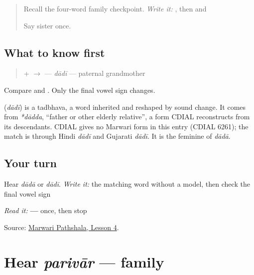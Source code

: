 \label{lesson:MW-C08-dadi}



\begin{quote}
Recall the four-word family checkpoint. \emph{Write it:} \textbf{}, then \textbf{} and \textbf{}

Say sister once.
\end{quote}

\subsection*{What to know first}
\begin{quote}
\textbf{} + \textbf{} $\to$ \textbf{} — \emph{dādī} — paternal grandmother
\end{quote}

Compare \textbf{} and \textbf{}. Only the final vowel sign changes.

\begin{cousinweb}
\textbf{} (\emph{dādī}) is a tadbhava, a word inherited and reshaped by sound change. It comes from \emph{*dādda}, \textquotedblleft{}father or other elderly relative\textquotedblright{}, a form CDIAL reconstructs from its descendants. CDIAL gives no Marwari form in this entry (CDIAL 6261); the match is through Hindi \emph{dādī} and Gujarati \emph{dādī}. It is the feminine of \emph{dādā}.
\end{cousinweb}

\subsection*{Your turn}
Hear \emph{dādā} or \emph{dādī}. \emph{Write it:} the matching word without a model, then check the final vowel sign

\begin{tcolorbox}[breakable,colback=teal!4,colframe=teal!35!black,title={Before you move on}]
\emph{Read it:} \textbf{ — } once, then stop

Source: \href{https://www.marwaripathshala.com/marwari-lesson-4-english}{Marwari Pathshala, Lesson 4}.
\end{tcolorbox}
\section[parivār]{Hear \emph{parivār} — family}

\label{lesson:MW-C08-hear-parivaar}



